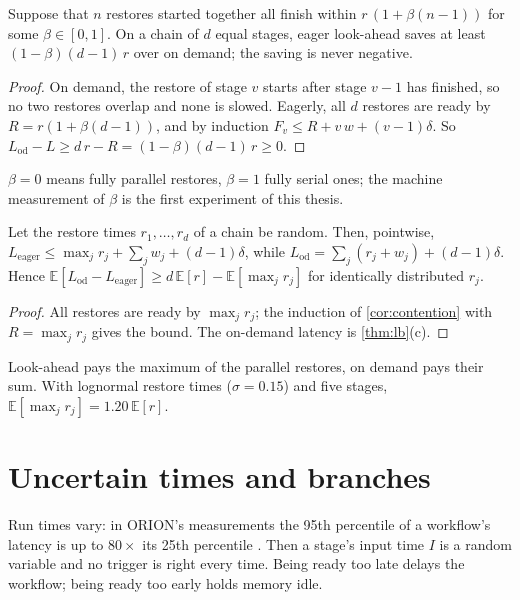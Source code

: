 \begin{corollary}
\label{cor:contention}
Suppose that $n$ restores started together all finish within $r\,(1 + \beta(n - 1))$ for some
$\beta \in [0, 1]$. On a chain of $d$ equal stages, eager look-ahead saves at least
$(1 - \beta)(d - 1)\,r$ over on demand; the saving is never negative.
\end{corollary}

\begin{proof}
On demand, the restore of stage $v$ starts after stage $v - 1$ has finished, so no two
restores overlap and none is slowed. Eagerly, all $d$ restores are ready by
$R = r(1 + \beta(d - 1))$, and by induction $F_v \le R + v\,w + (v - 1)\delta$. So
$L_{\mathrm{od}} - L \ge d\,r - R = (1 - \beta)(d - 1)\,r \ge 0$.
\end{proof}

$\beta = 0$ means fully parallel restores, $\beta = 1$ fully serial ones; the machine
measurement of $\beta$ is the first experiment of this thesis.

\begin{corollary}
\label{cor:random}
Let the restore times $r_1, \dots, r_d$ of a chain be random. Then, pointwise,
$L_{\mathrm{eager}} \le \max_j r_j + \sum_j w_j + (d - 1)\delta$, while
$L_{\mathrm{od}} = \sum_j (r_j + w_j) + (d - 1)\delta$. Hence
$\mathbb{E}[L_{\mathrm{od}} - L_{\mathrm{eager}}] \ge d\,\mathbb{E}[r] - \mathbb{E}[\max_j r_j]$
for identically distributed $r_j$.
\end{corollary}

\begin{proof}
All restores are ready by $\max_j r_j$; the induction of \cref{cor:contention} with $R = \max_j r_j$
gives the bound. The on-demand latency is \cref{thm:lb}(c).
\end{proof}

Look-ahead pays the maximum of the parallel restores, on demand pays their sum. With
lognormal restore times ($\sigma = 0.15$) and five stages, $\mathbb{E}[\max_j r_j] = 1.20\,
\mathbb{E}[r]$.

\section{Uncertain times and branches}
\label{sec:th-uncertain}

Run times vary: in ORION's measurements the 95th percentile of a workflow's latency is up to
$80\times$ its 25th percentile \cite{orion2022}. Then a stage's input time $I$ is a random
variable and no trigger is right every time. Being ready too late delays the workflow; being
ready too early holds memory idle.

